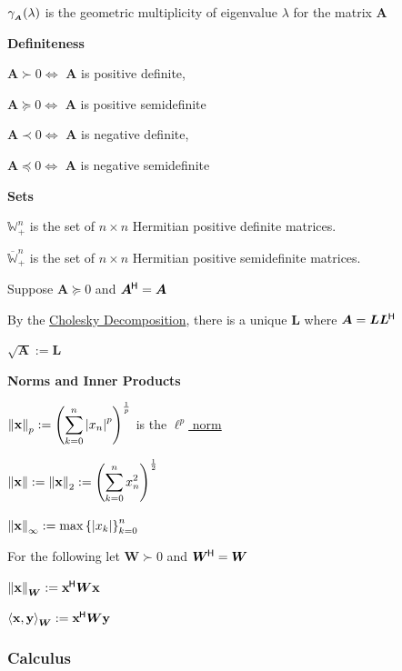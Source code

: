 \documentclass[11pt]{article}
\begin{document}
  \(\gamma_{_{\bm{A}}}(\lambda)\) is the geometric multiplicity of eigenvalue \(\lambda\) for the matrix \(\bm{A}\)

  \vspace{12pt}

  \pagebreak

  \textbf{Definiteness}

  \(\bm{A} \succ 0 \iff \) \(\bm{A}\) is positive definite,

  \(\bm{A} \succeq 0 \iff\) \(\bm{A}\) is positive semidefinite

  \(\bm{A} \prec 0 \iff \) \(\bm{A}\) is negative definite,

  \(\bm{A} \preceq 0 \iff\) \(\bm{A}\) is negative semidefinite

  \textbf{Sets}

  \(\mathbb{W}_{+}^n\) is the set of \(n \times n\) Hermitian positive definite matrices.

  \(\overbar{\mathbb{W}}_{+}^n\) is the set of \(n \times n\) Hermitian positive semidefinite matrices.

  Suppose \(\bm{A} \succeq 0\) and \(\bm{A}^{\mkern-1.5mu\mathsf{H}} = \bm{A}\)

   By the \href{https://www.wikiwand.com/en/Cholesky_decomposition}{Cholesky Decomposition}, there is a
   unique \(\bm{L}\) where \(\bm{A} = \bm{L}\bm{L}^{\mkern-1.5mu\mathsf{H}}\)

  \(\sqrt{\bm{A}} := \bm{L}\)

  \textbf{Norms and Inner Products}

  \(\left\lVert\mathbf{x}\right\rVert_p := \displaystyle {\left( \sum_{k = 0}^n \left|x_n\right|^p \right)}^{\frac{1}{p}}\) is the
  \href{https://www.wikiwand.com/en/Lp_space}{\(\ell^p\) norm}

  \(\left\lVert\mathbf{x}\right\rVert := \left\lVert\mathbf{x}\right\rVert_2 := \displaystyle {\left( \sum_{k = 0}^n x_n^2 \right)}^{\frac{1}{2}}\)

  \(\left\lVert\mathbf{x}\right\rVert_\infty := \max {\left\{ |x_k| \right\}}_{k = 0}^n\)

  \vspace{12pt}

  For the following let \(\bm{W} \succ 0\) and \(\bm{W}^{\mkern-1.5mu\mathsf{H}} = \bm{W}\)

  \(\left\lVert\mathbf{x}\right\rVert_{\bm{W}} := \mathbf{x}^{\mkern-1.5mu\mathsf{H}}\bm{W}\mathbf{x}\)

  \(\left\langle\mathbf{x}, \mathbf{y}\right\rangle_{\bm{W}} := \mathbf{x}^{\mkern-1.5mu\mathsf{H}}\bm{W}\mathbf{y}\)

  \pagebreak

  \subsubsection{Calculus}
\end{document}
